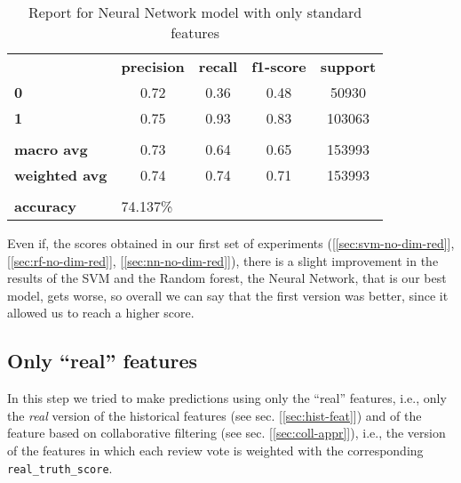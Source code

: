 \begin{table}[h!]
    \centering
    \begin{tabular}{lcccc}
        \rowcolor[HTML]{EEEEEE} 
        \cellcolor[HTML]{FBFBFB} & \textbf{precision} & \textbf{recall} & \textbf{f1-score} & \textbf{support} \\
        \rowcolor[HTML]{EEEEEE} 
        \textbf{0}               & 0.72               & 0.36            & 0.48              & 50930            \\
        \rowcolor[HTML]{EEEEEE} 
        \textbf{1}               & 0.75               & 0.93            & 0.83              & 103063           \\
        \rowcolor[HTML]{FBFBFB} 
        &                    &                 &                   &                  \\
        \rowcolor[HTML]{EEEEEE} 
        \textbf{macro avg}       & 0.73               & 0.64            & 0.65              & 153993           \\
        \rowcolor[HTML]{EEEEEE} 
        \textbf{weighted avg}    & 0.74               & 0.74            & 0.71              & 153993           \\
        \rowcolor[HTML]{FBFBFB} 
        &                    &                 &                   &                  \\
        \rowcolor[HTML]{EEEEEE} 
        \textbf{accuracy}        & \multicolumn{4}{l}{\cellcolor[HTML]{EEEEEE}74.137\%}                         
    \end{tabular}
    \caption{Report for Neural Network model with only standard features}
    \label{tab:nn-res-std}
\end{table}

Even if, \wrt the scores obtained in our first set of experiments ([\ref{sec:svm-no-dim-red}], [\ref{sec:rf-no-dim-red}], [\ref{sec:nn-no-dim-red}]), there is a slight improvement in the results of the SVM and the Random forest, the Neural Network, that is our best model, gets worse, so overall we can say that the first version was better, since it allowed us to reach a higher score.


\newpage
\subsection{Only ``real'' features} \label{sec:only-real}

In this step we tried to make predictions using only the ``real'' features, i.e., only the \textit{real} version of the historical features (see sec. [\ref{sec:hist-feat}]) and of the feature based on collaborative filtering (see sec. [\ref{sec:coll-appr}]), i.e., the version of the features in which each review vote is weighted with the corresponding \texttt{real\_truth\_score}.

